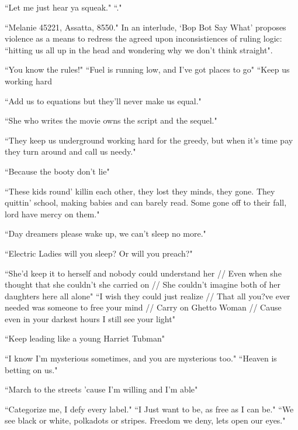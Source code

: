 \documentclass[11pt]{amsart}
\begin{document}
``Let me just hear ya squeak."\cite{happyhunting}
``."\cite{happyhunting}

``Melanie 45221, Assatta, 8550."\cite{chromeshoppe}
In an interlude, `Bop Bot Say What' proposes violence as a means to redress the agreed upon inconsistiences of ruling logic: ``hitting us all up in the head and wondering why we don't think straight"\cite{chromeshoppe}.

``You know the rules!"\cite{happyhunting}
``Fuel is running low, and I've got places to go"\cite{mrpresident}
``Keep us working hard 

``Add us to equations but they'll never make us equal."\cite{queen}

``She who writes the movie owns the script and the sequel."\cite{queen}

``They keep us underground working hard for the greedy, but when it's time pay they turn around and call us needy."\cite{queen}

``Because the booty don't lie"\cite{queen}

``These kids round' killin each other, they lost they minds, they gone. They quittin' school, making babies and can barely read. Some gone off to their fall, lord have mercy on them."\cite{sincerelyjane}

``Day dreamers please wake up, we can't sleep no more."\cite{sincerelyjane}

``Electric Ladies will you sleep? Or will you preach?"\cite{queen}

``She'd keep it to herself and nobody could understand her // Even when she thought that she couldn't she carried on // She couldn't imagine both of her daughters here all alone"\cite{ghettowoman}
``I wish they could just realize // That all you?ve ever needed was someone to free your mind // Carry on Ghetto Woman // Cause even in your darkest hours I still see your light" \cite{ghettowoman}

``Keep leading like a young Harriet Tubman"\cite{queen}

``I know I'm mysterious sometimes, and you are mysterious too."\cite{primetime}
``Heaven is betting on us."\cite{primetime}

``March to the streets 'cause I'm willing and I'm able"\cite{queen}

``Categorize me, I defy every label."\cite{queen}
``I Just want to be, as free as I can be."\cite{polkadottedstripes}
``We see black or white, polkadots or stripes. Freedom we deny, lets open our eyes."\cite{polkadottedstripes}
\end{document}
